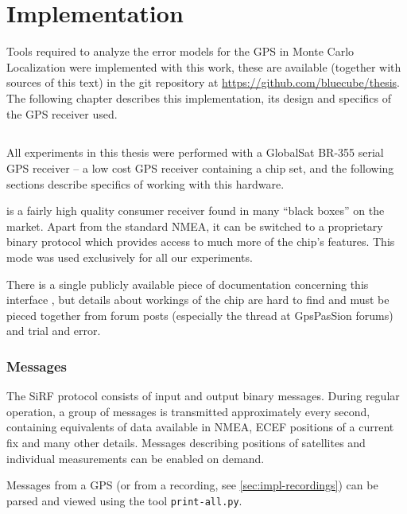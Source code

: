 \chapter{Implementation}
\label{chap:implementation}

Tools required to analyze the error models for the GPS in Monte Carlo Localization
were implemented with this work, these are
available (together with sources of this text) in the git repository at
\url{https://github.com/bluecube/thesis}.
The following chapter describes this implementation, its design and
specifics of the GPS receiver used.

\section{\sirf}
\label{sec:impl-sirf}

All experiments in this thesis were performed with a GlobalSat BR-355 serial GPS
receiver -- a low cost GPS receiver containing
a \sirf chip set, and the following sections describe specifics of working with
this hardware.

\sirf is a fairly high quality consumer receiver found in many
\enquote{black boxes} on the market.
Apart from the standard NMEA, it can be switched to a proprietary binary protocol
which provides access to much more of the chip's features.
This mode was used exclusively for all our experiments.

There is a single publicly available piece of documentation concerning this
interface \cite{sirf-protocol}, but details about workings of the chip are hard
to find and must be pieced together from forum posts (especially the thread
\cite{gpspassion-sirf} at GpsPasSion forums) and trial and error.

\subsection{Messages}
The SiRF protocol consists of input and output binary messages.
During regular operation, a group of messages is transmitted approximately every second,
containing equivalents of data available in NMEA, ECEF positions of a current
fix and many other details.
Messages describing positions of satellites and individual measurements can be
enabled on demand.

Messages from a GPS (or from a recording, see \cref{sec:impl-recordings}) can be
parsed and viewed using the tool \verb=print-all.py=.

